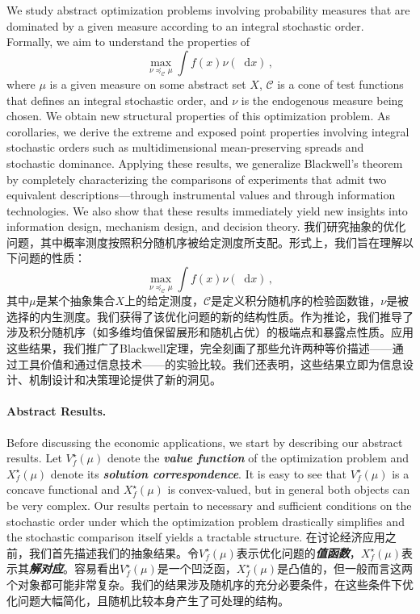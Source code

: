 \documentclass[12pt,letterpaper]{article}
\newenvironment{original}{\color{black}}{}
\newenvironment{translation}{\color{blue}}{}
\theoremstyle{plain}
\theoremstyle{definition}
\theoremstyle{remark}
\newcommand{\C}{\mathcal{C}}
\renewcommand*\d{\mathop{}\!\mathrm{d}}
\theoremstyle{definition}
\begin{document}
\begin{original}
We study abstract optimization problems involving probability measures that are dominated by a given measure according to an integral stochastic order. Formally, we aim to understand the properties of
\[\max_{\nu \preceq_\C \mu} \int f(x) \nu(\d x)\,,\]
where $\mu$ is a given measure on some abstract set $X$, $\C$ is a cone of test functions that defines an integral stochastic order, and $\nu$ is the endogenous measure being chosen. We obtain new structural properties of this optimization problem. As corollaries, we derive the extreme and exposed point properties involving integral stochastic orders such as multidimensional mean-preserving spreads and stochastic dominance. Applying these results, we generalize Blackwell's theorem by completely characterizing the comparisons of experiments that admit two equivalent descriptions---through instrumental values and through information technologies. We also show that these results immediately yield new insights into information design, mechanism design, and decision theory.
\end{original}
\begin{translation}
我们研究抽象的优化问题，其中概率测度按照积分随机序被给定测度所支配。形式上，我们旨在理解以下问题的性质：
\[\max_{\nu \preceq_\C \mu} \int f(x) \nu(\d x)\,,\]
其中$\mu$是某个抽象集合$X$上的给定测度，$\C$是定义积分随机序的检验函数锥，$\nu$是被选择的内生测度。我们获得了该优化问题的新的结构性质。作为推论，我们推导了涉及积分随机序（如多维均值保留展形和随机占优）的极端点和暴露点性质。应用这些结果，我们推广了Blackwell定理，完全刻画了那些允许两种等价描述——通过工具价值和通过信息技术——的实验比较。我们还表明，这些结果立即为信息设计、机制设计和决策理论提供了新的洞见。
\end{translation}

\paragraph{Abstract Results.}\hspace{-2mm}

\begin{original}
Before discussing the economic applications, we start by describing our abstract results. Let $V^\star_f(\mu)$ denote the \textit{\textbf{value function}} of the optimization problem and $X^\star_f(\mu)$ denote its \textit{\textbf{solution correspondence}}. It is easy to see that $V^\star_f(\mu)$ is a concave functional and $X^\star_f(\mu)$ is convex-valued, but in general both objects can be very complex. Our results pertain to necessary and sufficient conditions on the stochastic order under which the optimization problem drastically simplifies and the stochastic comparison itself yields a tractable structure.
\end{original}
\begin{translation}
在讨论经济应用之前，我们首先描述我们的抽象结果。令$V^\star_f(\mu)$表示优化问题的\textit{\textbf{值函数}}，$X^\star_f(\mu)$表示其\textit{\textbf{解对应}}。容易看出$V^\star_f(\mu)$是一个凹泛函，$X^\star_f(\mu)$是凸值的，但一般而言这两个对象都可能非常复杂。我们的结果涉及随机序的充分必要条件，在这些条件下优化问题大幅简化，且随机比较本身产生了可处理的结构。
\end{translation}
\end{document}
